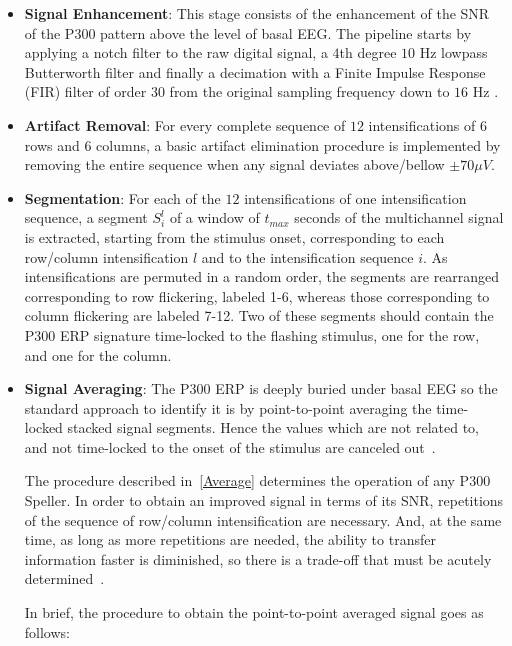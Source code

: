 \begin{itemize}
\item \textbf{Signal Enhancement}: This stage consists of the enhancement of the SNR of the P300 pattern above the level of basal EEG. The pipeline starts by applying a notch filter to the raw digital signal, a $4$th degree $10$ Hz lowpass Butterworth filter and finally a decimation with a Finite Impulse Response (FIR) filter of order $30$ from the original sampling frequency down to $16$ Hz \cite{Krusienski2006}.
\item \textbf{Artifact Removal}: For every complete sequence of $12$ intensifications of $6$ rows and $6$ columns, a basic artifact elimination procedure is implemented by removing the entire sequence when any signal deviates above/bellow $ \pm 70 \mu V $.
\item \textbf{Segmentation}: For each of the $12$ intensifications of one intensification sequence,  a segment $S_{i}^l$  of a window of $t_{max} $ seconds of the multichannel signal is extracted, starting from the stimulus onset, corresponding to each row/column intensification $l$ and to the intensification sequence $i$. As intensifications are permuted in a random order, the segments are rearranged corresponding to row flickering, labeled 1-6, whereas those corresponding to column flickering are labeled 7-12.  Two of these segments should contain the P300 ERP signature time-locked to the flashing stimulus, one for the row, and one for the column.
\item \textbf{Signal Averaging}: \label{Average}  The P300 ERP is deeply buried under basal EEG so the standard approach to identify it is by point-to-point averaging the time-locked stacked signal segments.  Hence the values which are not related to, and not time-locked to the onset of the stimulus are canceled out~\cite{Liang2008}.  

\begin{story}
The procedure described in~\ref{Average} determines the operation of any P300 Speller.  In order to obtain an improved signal in terms of its SNR,  repetitions of the sequence of row/column intensification are necessary.  And, at the same time, as long as more repetitions are needed, the ability to transfer information faster is diminished, so there is a trade-off that must be acutely determined~\cite{Krusienski2006}.
\end{story}

In brief, the procedure to obtain the point-to-point averaged signal goes as follows:


\end{itemize}
